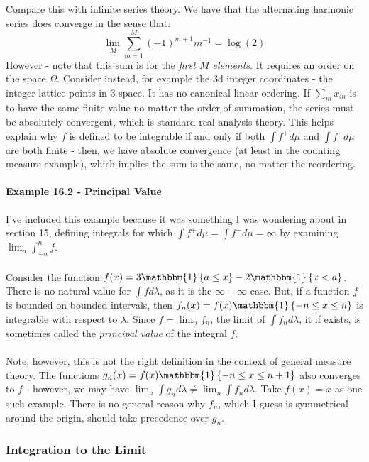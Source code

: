\documentclass[12pt,a4paper]{article}
\newcommand{\1}[1]{\mathbbm{1}\left\{ #1 \right\}}
\begin{document}
\\\\
Compare this with infinite series theory. We have that the alternating harmonic series does converge in the sense that:
$$
	\lim_M \sum_{m=1}^M (-1)^{m+1}m^{-1} = \log(2)
$$
However - note that this sum is for the \textit{first $M$ elements}. It requires an order on the space $\Omega$. Consider instead, for example the 3d integer coordinates - the integer lattice points in 3 space. It has no canonical linear ordering. If $\sum_m x_m$ is to have the same finite value no matter the order of summation, the series must be absolutely convergent, which is standard real analysis theory. This helps explain why $f$ is defined to be integrable if and only if both $\int f^+ d\mu$ and $\int f^- d\mu$ are both finite - then, we have absolute convergence (at least in the counting measure example), which implies the sum is the same, no matter the reordering. 

\paragraph{Example 16.2 - Principal Value} I've included this example because it was something I was wondering about in section 15, defining integrals for which $\int f^+ d\mu = \int f^- d\mu = \infty$ by examining $\lim_n \int_{-n}^n f$.
\\\\
Consider the function $f(x) = 3\1{a \leq x} - 2\1{x < a}$. There is no natural value for $\int f d\lambda$, as it is the $\infty - \infty$ case. But, if a function $f$ is bounded on bounded intervals, then $f_n(x) = f(x)\1{-n \leq x \leq n}$ is integrable with respect to $\lambda$. Since $f = \lim_n f_n$, the limit of $\int f_n d\lambda$, it if exists, is sometimes called the \textit{principal value} of the integral $f$.
\\\\
Note, however, this is not the right definition in the context of general measure theory. The functions $g_n(x) = f(x)\1{-n \leq x \leq n+1}$ also converges to $f$ - however, we may have $\lim_n \int g_n d\lambda \neq \lim_n \int f_n d\lambda$. Take $f(x) = x$ as one such example. There is no general reason why $f_n$, which I guess is symmetrical around the origin, should take precedence over $g_n$. 

\subsubsection{Integration to the Limit}
\end{document}
